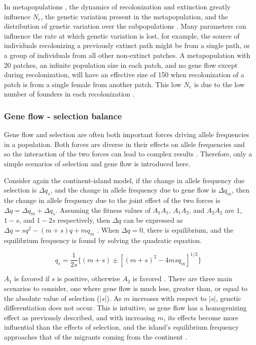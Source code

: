 In metapopulations \parencite{Levins1969}, the dynamics of recolonization and extinction greatly influence $N_e$, the genetic variation present in the metapopulation, and the distribution of genetic variation over the subpopulations \parencite{Slatkin1977,Hedrick1997,Whitlock1997,Nunney1999}.
Many parameters can influence the rate at which genetic variation is lost, for example, the source of individuals recolonizing a previously extinct path might be from a single path, or a group of individuals from all other non-extinct patches.
A metapopulation with 20 patches, an infinite population size in each patch, and no gene flow except during recolonization, will have an effective size of 150 when recolonization of a patch is from a single female from another patch.
This low $N_e$ is due to the low number of founders in each recolonization \parencite{Hedrick1997, Hedrick2010}. 


\subsubsection{Gene flow - selection balance}

Gene flow and selection are often both important forces driving allele frequencies in a population.
Both forces are diverse in their effects on allele frequencies and so the interaction of the two forces can lead to complex results \parencite{Lenormand2002}.
Therefore, only a simple scenarios of selection and gene flow is introduced here.

Consider again the continent-island model, if the change in allele frequency due selection is $\Delta q_s$, and the change in allele frequency due to gene flow is $\Delta q_m$, then the change in allele frequency due to the joint effect of the two forces is $\Delta q=\Delta q_m + \Delta q_s$\parencite{Hedrick2010}.
Assuming the fitness values of $A_1A_1$, $A_1A_2$, and $A_2A_2$ are $1$, $1-s$, and $1-2s$ respectively, then $\Delta q$ can be expressed as $\Delta q = sq^2-(m+s)q+mq_m$ \parencite{Li1976}. 
When $\Delta q = 0$, there is equilibrium, and the equilibrium frequency is found by solving the quadratic equation.

\begin{equation}
q_e = \frac{1}{2s}\{(m+s)\pm[(m+s)^2-4msq_m]^{1/2}\}
\end{equation}

$A_1$ is favored if $s$ is positive, otherwise $A_2$ is favored \parencite{Hedrick2010}.
There are three main scenarios to consider, one where gene flow is much less, greater than, or equal to the absolute value of selection ($|s|$).
As $m$ increases with respect to $|s|$, genetic differentiation does not occur.
This is intuitive, as gene flow has a homogenizing effect as previously described, and with increasing $m$, its effects become more influential than the effects of selection, and the island's equilibrium frequency approaches that of the migrants coming from the continent \parencite{Li1976}.

